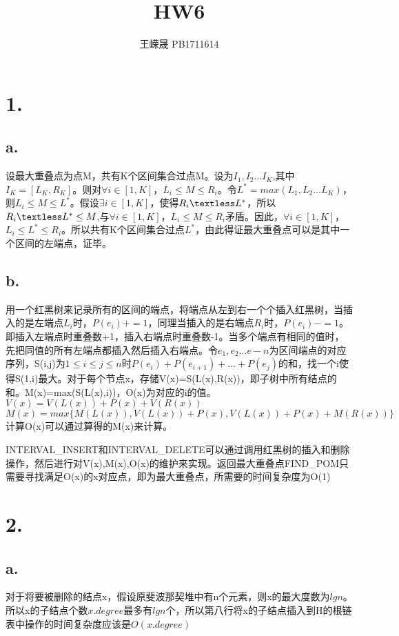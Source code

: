 \documentclass[UTF8, 11pt]{ctexart}
\title{HW6}
\author{王嵘晟 \quad PB1711614}
\date{}
\begin{document}
	\maketitle
	\section*{1.}
	\subsection*{a.}
	\par{设最大重叠点为点M，共有K个区间集合过点M。设为$I_{1},I_{2}...I_{K}$,其中$I_{K}=[L_{K},R_{K}]$。则对$ {\forall}i\in [1,K]$，$L_{i}\leq M\leq R_{i}$。令$L^{*}=max(L_{1},L_{2}...L_{K})$，则$L_{i}\leq M \leq L^{*}$。假设$ {\exists}i\in [1,K]$，使得$R_{i}\textless L^{*}$，所以$R_{i}\textless L^{*}\leq M$,与$ {\forall}i\in [1,K]$，$L_{i}\leq M\leq R_{i}$矛盾。因此，$ {\forall}i\in [1,K]$，$L_{i}\leq L^{*}\leq R_{i}$。所以共有K个区间集合过点$L^{*}$，由此得证最大重叠点可以是其中一个区间的左端点，证毕。}
	\subsection*{b.}
	\par{用一个红黑树来记录所有的区间的端点，将端点从左到右一个个插入红黑树，当插入的是左端点$L_{i}$时，$P(e_{i})+=1$，同理当插入的是右端点$R_{i}$时，$P(e_{i})-=1$。即插入左端点时重叠数+1，插入右端点时重叠数-1。当多个端点有相同的值时，先把同值的所有左端点都插入然后插入右端点。令$e_{1},e_{2}...e-{n}$为区间端点的对应序列，S(i,j)为$1\leq i\leq j\leq n$时$P(e_{i})+P(e_{i+1})+...+P(e_{j})$的和，找一个i使得S(1,i)最大。对于每个节点x，存储V(x)=S(L(x),R(x))，即子树中所有结点的和。M(x)=max(S(L(x),i))，O(x)为对应的i的值。}\\
	$V(x)=V(L(x))+P(x)+V(R(x))$\\
	$M(x)=max\{M(L(x)),V(L(x))+P(x),V(L(x))+P(x)+M(R(x))\}$\\
	计算O(x)可以通过算得的M(x)来计算。
	\par{INTERVAL\_INSERT和INTERVAL\_DELETE可以通过调用红黑树的插入和删除操作，然后进行对V(x),M(x),O(x)的维护来实现。返回最大重叠点FIND\_POM只需要寻找满足O(x)的x对应点，即为最大重叠点，所需要的时间复杂度为O(1)}
	\section*{2.}
	\subsection*{a.}
	\par{对于将要被删除的结点x，假设原斐波那契堆中有n个元素，则x的最大度数为$lgn$。所以x的子结点个数$x.degree$最多有$lgn$个，所以第八行将x的子结点插入到H的根链表中操作的时间复杂度应该是$O(x.degree)$}
\end{document}
